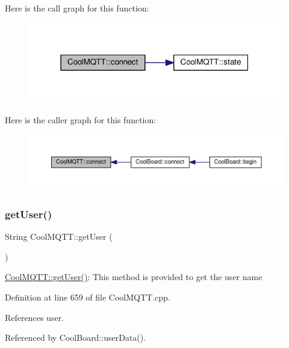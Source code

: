 Here is the call graph for this function\+:
\nopagebreak
\begin{figure}[H]
\begin{center}
\leavevmode
\includegraphics[width=313pt]{classCoolMQTT_a58b0b1f64b269c2681685208262fba1d_cgraph}
\end{center}
\end{figure}
Here is the caller graph for this function\+:
\nopagebreak
\begin{figure}[H]
\begin{center}
\leavevmode
\includegraphics[width=350pt]{classCoolMQTT_a58b0b1f64b269c2681685208262fba1d_icgraph}
\end{center}
\end{figure}
\mbox{\label{classCoolMQTT_a373cc92fca7760d886f02d8a6e5b3f63}} 
\subsubsection{\texorpdfstring{get\+User()}{getUser()}}
{\footnotesize\ttfamily String Cool\+M\+Q\+T\+T\+::get\+User (\begin{DoxyParamCaption}{ }\end{DoxyParamCaption})}

\hyperlink{classCoolMQTT_a373cc92fca7760d886f02d8a6e5b3f63}{Cool\+M\+Q\+T\+T\+::get\+User()}\+: This method is provided to get the user name 

Definition at line 659 of file Cool\+M\+Q\+T\+T.\+cpp.



References user.



Referenced by Cool\+Board\+::user\+Data().


